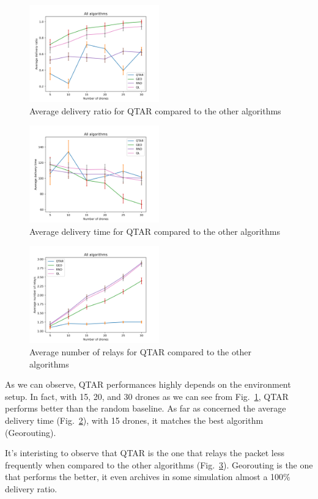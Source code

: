 \begin{figure}[h]
    \centering
    \includegraphics[width=0.5\textwidth]{../plots/average_delivery_ratio.png}
    \caption{Average delivery ratio for QTAR compared to the other algorithms}\label{fig:average_delivery_ratio}
\end{figure}

\begin{figure}[h]
    \centering
    \includegraphics[width=0.5\textwidth]{../plots/average_delivery_time.png}
    \caption{Average delivery time for QTAR compared to the other algorithms}\label{fig:average_delivery_time}
\end{figure}

\begin{figure}[h]
    \centering
    \includegraphics[width=0.5\textwidth]{../plots/average_number_of_relays.png}
    \caption{Average number of relays for QTAR compared to the other algorithms}\label{fig:average_number_of_relays}
\end{figure}

As we can observe, QTAR performances highly depends on the environment setup. In fact, with 15, 20, and 30 drones as we can see from Fig.~\ref{fig:average_delivery_ratio}, QTAR performs better than the random baseline.
As far as concerned the average delivery time (Fig.~\ref{fig:average_delivery_time}), with 15 drones, it matches the best algorithm (Georouting).

It's interisting to observe that QTAR is the one that relays the packet less frequently when compared to the other algorithms (Fig.~\ref{fig:average_number_of_relays}).
Georouting is the one that performs the better, it even archives in some simulation almost a 100\% delivery ratio.